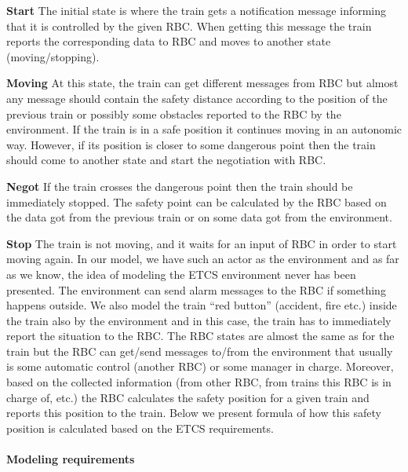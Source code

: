 \documentclass{template/openetcs_article}
\begin{document}
\textbf{Start} The initial state is where the train gets a notification message informing that it is controlled by the given RBC. When getting this message the train reports the corresponding data to RBC and moves to another state (moving/stopping).

\textbf{Moving} At this state, the train can get different messages from RBC but almost any message should contain the safety distance according to the position of the previous train or possibly some obstacles reported to the RBC by the environment. If the train is in a safe position it continues moving in an autonomic way. However, if its position is closer to some dangerous point then the train should come to another state and start the negotiation with RBC.

\textbf{Negot} If the train crosses the dangerous point then the train should be immediately stopped. The safety point can be calculated by the RBC based on the data got from the previous train or on some data got from the environment.

\textbf{Stop} The train is not moving, and it waits for an input of RBC in order to start moving again. In our model, we have such an actor as the environment and as far as we know, the idea of modeling the ETCS environment never has been presented. The environment can send alarm messages to the RBC if something happens outside. We also model the train “red button” (accident, fire etc.) inside the train also by the environment and in this case, the train has to immediately report the situation to the RBC. The RBC states are almost the same as for the train but the RBC can get/send messages to/from the environment that usually is some automatic control (another RBC) or some manager in charge. Moreover, based on the collected information (from other RBC, from trains this RBC is in charge of, etc.) the RBC calculates the safety position for a given train and reports this position to the train. Below we present formula of how this safety position is calculated based on the ETCS requirements.

\paragraph{Modeling requirements}
\end{document}
